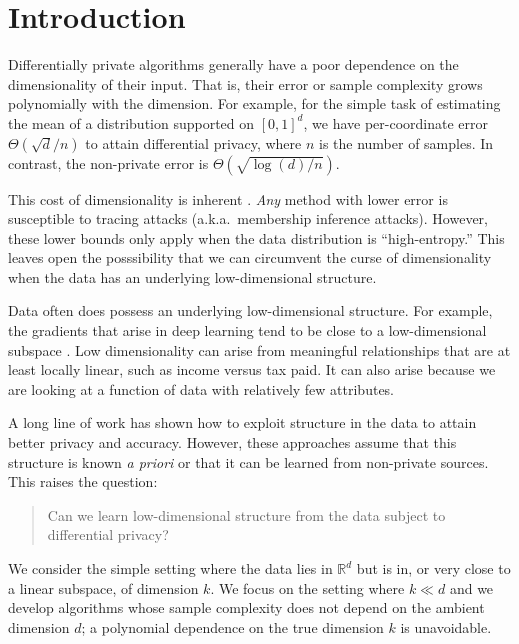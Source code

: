 \section{Introduction}

Differentially private algorithms generally have a poor dependence on the dimensionality of their input. That is, their error or sample complexity grows polynomially with the dimension. For example, for the simple task of estimating the mean of a distribution supported on $[0,1]^d$, we have per-coordinate error $\Theta(\sqrt{d}/n)$ to attain differential privacy, where $n$ is the number of samples. In contrast, the non-private error is $\Theta(\sqrt{\log(d)/n})$.

This cost of dimensionality is inherent \cite{BunUV14,SteinkeU17a,DworkSSUV15}. \emph{Any} method with lower error is susceptible to tracing attacks (a.k.a.~membership inference attacks). However, these lower bounds only apply when the data distribution is ``high-entropy.'' This leaves open the posssibility that we can circumvent the curse of dimensionality when the data has an underlying low-dimensional structure.

Data often does possess an underlying low-dimensional structure. For example, the gradients that arise in deep learning tend to be close to a low-dimensional subspace \cite{AbadiCGMMTZ16,LiZTSG17,GurAriRD18,LiFLY18,LiGZCB19,ZhouWB20,FengT20}. Low dimensionality can arise from meaningful relationships that are at least locally linear, such as income versus tax paid. It can also arise because we are looking at a function of data with relatively few attributes.

A long line of work \cite[etc.]{BlumLR08,HardtT10,HardtR10,Ullman15,BlasiokBNS19,BassilyCMNUW20,ZhouWB20,KairouzRRT20} has shown how to exploit structure in the data to attain better privacy and accuracy. However, these approaches assume that this structure is known \emph{a priori} or that it can be learned from non-private sources. This raises the question:
\begin{quote}
    Can we learn low-dimensional structure from the data subject to differential privacy?
\end{quote}
We consider the simple setting where the data lies in $\mathbb{R}^d$ but is in, or very close to a linear subspace, of dimension $k$. We focus on the setting where $k \ll d$ and we develop algorithms whose sample complexity does not depend on the ambient dimension $d$; a polynomial dependence on the true dimension $k$ is unavoidable.

